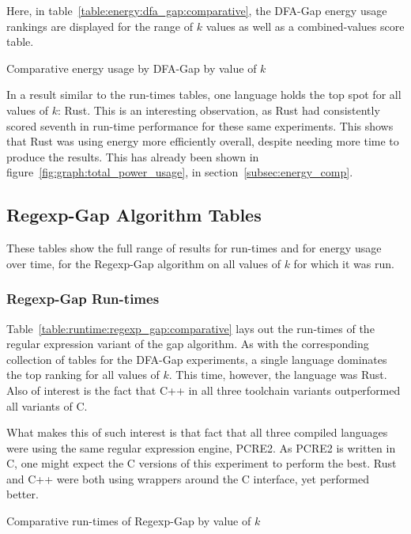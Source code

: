 Here, in table~\ref{table:energy:dfa_gap:comparative}, the DFA-Gap energy usage rankings are displayed for the range of $k$ values as well as a combined-values score table.

\begin{table}[!htb]

\caption{Comparative energy usage by DFA-Gap by value of $k$}
\label{table:energy:dfa_gap:comparative}
\end{table}

In a result similar to the run-times tables, one language holds the top spot for all values of $k$: Rust. This is an interesting observation, as Rust had consistently scored seventh in run-time performance for these same experiments. This shows that Rust was using energy more efficiently overall, despite needing more time to produce the results. This has already been shown in figure~\ref{fig:graph:total_power_usage}, in section~\ref{subsec:energy_comp}.

\subsection{Regexp-Gap Algorithm Tables}

These tables show the full range of results for run-times and for energy usage over time, for the Regexp-Gap algorithm on all values of $k$ for which it was run.

\subsubsection{Regexp-Gap Run-times}

Table~\ref{table:runtime:regexp_gap:comparative} lays out the run-times of the regular expression variant of the gap algorithm. As with the corresponding collection of tables for the DFA-Gap experiments, a single language dominates the top ranking for all values of $k$. This time, however, the language was Rust. Also of interest is the fact that C++ in all three toolchain variants outperformed all variants of C.

What makes this of such interest is that fact that all three compiled languages were using the same regular expression engine, PCRE2. As PCRE2 is written in C, one might expect the C versions of this experiment to perform the best. Rust and C++ were both using wrappers around the C interface, yet performed better.

\begin{table}[!htb]

\caption{Comparative run-times of Regexp-Gap by value of $k$}
\label{table:runtime:regexp_gap:comparative}
\end{table}

